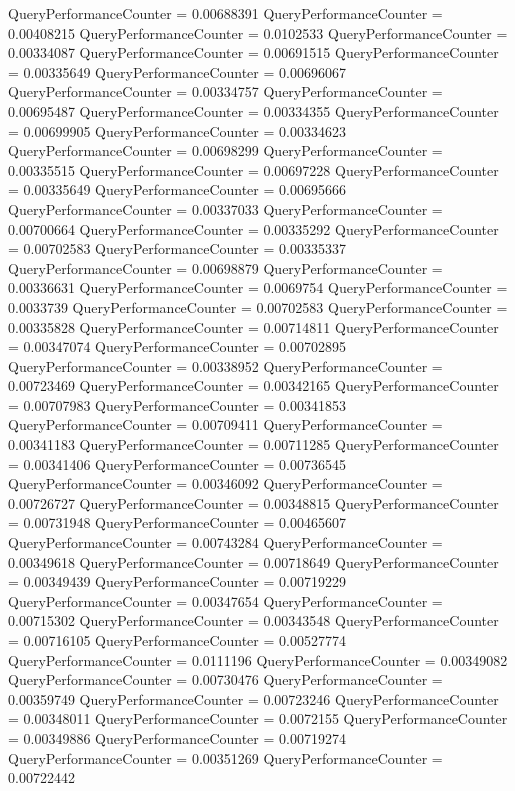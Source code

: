 \documentclass[9pt]{article}
\theoremstyle{plain}
\theoremstyle{definition}
\theoremstyle{remark}
\numberwithin{equation}{section}
\begin{document}
QueryPerformanceCounter  =  0.00688391
QueryPerformanceCounter  =  0.00408215
QueryPerformanceCounter  =  0.0102533
QueryPerformanceCounter  =  0.00334087
QueryPerformanceCounter  =  0.00691515
QueryPerformanceCounter  =  0.00335649
QueryPerformanceCounter  =  0.00696067
QueryPerformanceCounter  =  0.00334757
QueryPerformanceCounter  =  0.00695487
QueryPerformanceCounter  =  0.00334355
QueryPerformanceCounter  =  0.00699905
QueryPerformanceCounter  =  0.00334623
QueryPerformanceCounter  =  0.00698299
QueryPerformanceCounter  =  0.00335515
QueryPerformanceCounter  =  0.00697228
QueryPerformanceCounter  =  0.00335649
QueryPerformanceCounter  =  0.00695666
QueryPerformanceCounter  =  0.00337033
QueryPerformanceCounter  =  0.00700664
QueryPerformanceCounter  =  0.00335292
QueryPerformanceCounter  =  0.00702583
QueryPerformanceCounter  =  0.00335337
QueryPerformanceCounter  =  0.00698879
QueryPerformanceCounter  =  0.00336631
QueryPerformanceCounter  =  0.0069754
QueryPerformanceCounter  =  0.0033739
QueryPerformanceCounter  =  0.00702583
QueryPerformanceCounter  =  0.00335828
QueryPerformanceCounter  =  0.00714811
QueryPerformanceCounter  =  0.00347074
QueryPerformanceCounter  =  0.00702895
QueryPerformanceCounter  =  0.00338952
QueryPerformanceCounter  =  0.00723469
QueryPerformanceCounter  =  0.00342165
QueryPerformanceCounter  =  0.00707983
QueryPerformanceCounter  =  0.00341853
QueryPerformanceCounter  =  0.00709411
QueryPerformanceCounter  =  0.00341183
QueryPerformanceCounter  =  0.00711285
QueryPerformanceCounter  =  0.00341406
QueryPerformanceCounter  =  0.00736545
QueryPerformanceCounter  =  0.00346092
QueryPerformanceCounter  =  0.00726727
QueryPerformanceCounter  =  0.00348815
QueryPerformanceCounter  =  0.00731948
QueryPerformanceCounter  =  0.00465607
QueryPerformanceCounter  =  0.00743284
QueryPerformanceCounter  =  0.00349618
QueryPerformanceCounter  =  0.00718649
QueryPerformanceCounter  =  0.00349439
QueryPerformanceCounter  =  0.00719229
QueryPerformanceCounter  =  0.00347654
QueryPerformanceCounter  =  0.00715302
QueryPerformanceCounter  =  0.00343548
QueryPerformanceCounter  =  0.00716105
QueryPerformanceCounter  =  0.00527774
QueryPerformanceCounter  =  0.0111196
QueryPerformanceCounter  =  0.00349082
QueryPerformanceCounter  =  0.00730476
QueryPerformanceCounter  =  0.00359749
QueryPerformanceCounter  =  0.00723246
QueryPerformanceCounter  =  0.00348011
QueryPerformanceCounter  =  0.0072155
QueryPerformanceCounter  =  0.00349886
QueryPerformanceCounter  =  0.00719274
QueryPerformanceCounter  =  0.00351269
QueryPerformanceCounter  =  0.00722442
\end{document}
